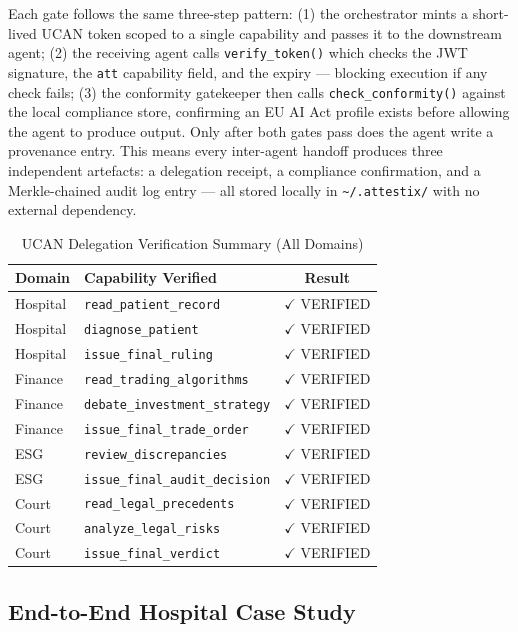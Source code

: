 Each gate follows the same three-step pattern: (1) the orchestrator mints a short-lived UCAN token scoped to a single capability and passes it to the downstream agent; (2) the receiving agent calls \texttt{verify\_token()} which checks the JWT signature, the \texttt{att} capability field, and the expiry --- blocking execution if any check fails; (3) the conformity gatekeeper then calls \texttt{check\_conformity()} against the local compliance store, confirming an EU AI Act profile exists before allowing the agent to produce output. Only after both gates pass does the agent write a provenance entry. This means every inter-agent handoff produces three independent artefacts: a delegation receipt, a compliance confirmation, and a Merkle-chained audit log entry --- all stored locally in \texttt{\textasciitilde/.attestix/} with no external dependency.

\begin{table}[H]
\centering
\caption{UCAN Delegation Verification Summary (All Domains)}
\begin{tabular}{|l|l|c|}
\hline
\textbf{Domain} & \textbf{Capability Verified} & \textbf{Result} \\
\hline
Hospital & \texttt{read\_patient\_record} & $\checkmark$ VERIFIED \\
Hospital & \texttt{diagnose\_patient} & $\checkmark$ VERIFIED \\
Hospital & \texttt{issue\_final\_ruling} & $\checkmark$ VERIFIED \\
Finance & \texttt{read\_trading\_algorithms} & $\checkmark$ VERIFIED \\
Finance & \texttt{debate\_investment\_strategy} & $\checkmark$ VERIFIED \\
Finance & \texttt{issue\_final\_trade\_order} & $\checkmark$ VERIFIED \\
ESG & \texttt{review\_discrepancies} & $\checkmark$ VERIFIED \\
ESG & \texttt{issue\_final\_audit\_decision} & $\checkmark$ VERIFIED \\
Court & \texttt{read\_legal\_precedents} & $\checkmark$ VERIFIED \\
Court & \texttt{analyze\_legal\_risks} & $\checkmark$ VERIFIED \\
Court & \texttt{issue\_final\_verdict} & $\checkmark$ VERIFIED \\
\hline
\end{tabular}
\end{table}

\subsection{End-to-End Hospital Case Study}

